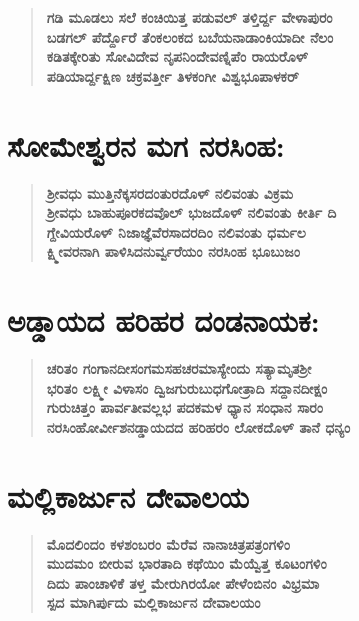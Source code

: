 \begin{verse}
\textbf{ಗಡಿ ಮೂಡಲು ಸಲೆ ಕಂಚಿಯಿತ್ತ ಪಡುವಲ್​ ತಳ್ತಿರ್ದ್ದ ವೇಳಾಪುರಂ \\ ಬಡಗಲ್​ ಪೆರ್ದ್ದೊರೆ ತೆಂಕಲಂಕದ ಬಬೆಯನಾಡಾಂಕಿಯಾದೀ ನೆಲಂ \\ ಕಡಿತಕ್ಕೇರಿತು ಸೋವಿದೇವ ನೃಪನಿಂದೇವಣ್ನಿಪೆಂ ರಾಯರೊಳ್​ \\ ಪಡಿಯಾರ್ದ್ದಕ್ಷಿಣ ಚಕ್ರವರ್ತ್ತೀ ತಿಳಕಂಗೀ ವಿಶ್ವಭೂಪಾಳಕರ್​}
\end{verse}

\vskip 2pt

\section*{ಸೋಮೇಶ್ವರನ ಮಗ ನರಸಿಂಹ:}

\begin{verse}
\textbf{ಶ‍್ರೀವಧು ಮುತ್ತಿನೆಕ್ಕಸರದಂತುರದೊಳ್​ ನಲಿವಂತು ವಿಕ್ರಮ \\ ಶ‍್ರೀವಧು ಬಾಹುಪೂರಕದವೊಲ್​ ಭುಜದೊಳ್​ ನಲಿವಂತು ಕೀರ್ತಿ ದಿ \\ ಗ್ದೇವಿಯರೊಳ್​ ನಿಜಾಜ್ಞೆವೆರಸಾದರದಿಂ ನಲಿವಂತು ಧರ್ಮಲ \\ ಕ್ಷ್ಮೀವರನಾಗಿ ಪಾಳಿಸಿದನುರ್ವ್ವರೆಯಂ ನರಸಿಂಹ ಭೂಬುಜಂ}
\end{verse}

\vskip 2pt

\section*{ಅಡ್ಡಾಯದ ಹರಿಹರ ದಂಡನಾಯಕ:}

\begin{verse}
\textbf{ಚರಿತಂ ಗಂಗಾನದೀಸಂಗಮಸಹಚರಮಾಸ್ಯೇಂದು ಸತ್ಯಾಮೃತಶ‍್ರೀ\\ ಭರಿತಂ ಲಕ್ಷ್ಮೀ ವಿಳಾಸಂ ದ್ವಿಜಗುರುಬುಧಗೋತ್ರಾದಿ ಸದ್ದಾನದೀಕ್ಷಂ \\ ಗುರುಚಿತ್ತಂ ಪಾರ್ವತೀವಲ್ಲಭ ಪದಕಮಳ ಧ್ಯಾನ ಸಂಧಾನ ಸಾರಂ \\ ನರಸಿಂಹೋರ್ವೀಶನಡ್ಡಾಯದದ ಹರಿಹರಂ ಲೋಕದೊಳ್​ ತಾನೆ ಧನ್ಯಂ}
\end{verse}

\section*{ಮಲ್ಲಿಕಾರ್ಜುನ ದೇವಾಲಯ}

\begin{verse}
\textbf{ಮೊದಲಿಂದಂ ಕಳಶಂಬರಂ ಮೆರೆವ ನಾನಾಚಿತ್ರಪತ್ರಂಗಳಿಂ \\ ಮುದಮಂ ಬೀರುವ ಭಾರತಾದಿ ಕಥೆಯಿಂ ಮೆಯ್ವೆತ್ತ ಕೂಟಂಗಳಿಂ \\ ದಿದು ಪಾಂಚಾಳಿಕೆ ತಳ್ತ ಮೇರುಗಿರಯೋ ಪೇಳೆಂಬಿನಂ ವಿಭ್ರಮಾ \\ ಸ್ಪದ ಮಾಗಿರ್ಪುದು ಮಲ್ಲಿಕಾರ್ಜುನ ದೇವಾಲಯಂ}
\end{verse}

